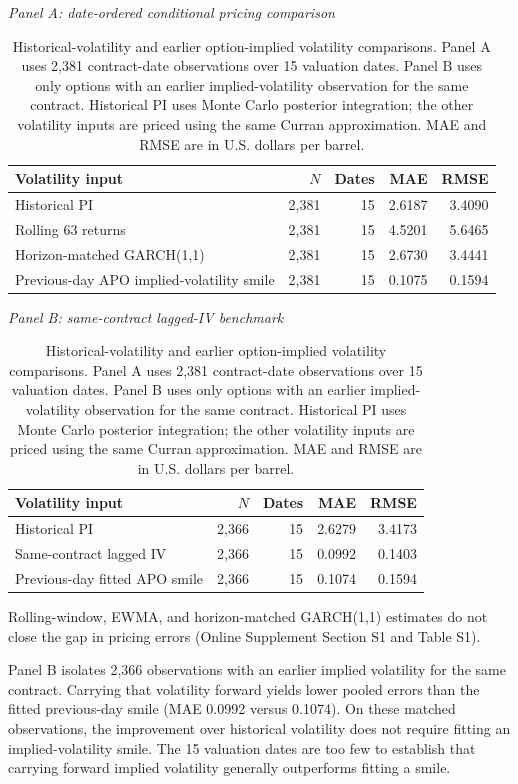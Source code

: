\begin{table}[t]
\centering
\caption{Historical-volatility and earlier option-implied volatility comparisons. Panel A uses 2,381 contract-date observations over 15 valuation dates. Panel B uses only options with an earlier implied-volatility observation for the same contract. Historical PI uses Monte Carlo posterior integration; the other volatility inputs are priced using the same Curran approximation. MAE and RMSE are in U.S. dollars per barrel.}\label{tab:short_forward}

\textit{Panel A: date-ordered conditional pricing comparison}\\[2pt]
\begin{tabular}{lrrrr}
\toprule
Volatility input & $N$ & Dates & MAE & RMSE\\
\midrule
Historical PI & 2,381 & 15 & 2.6187 & 3.4090\\
Rolling 63 returns & 2,381 & 15 & 4.5201 & 5.6465\\
Horizon-matched GARCH(1,1) & 2,381 & 15 & 2.6730 & 3.4441\\
Previous-day APO implied-volatility smile & 2,381 & 15 & 0.1075 & 0.1594\\
\bottomrule
\end{tabular}

\vspace{5pt}
\textit{Panel B: same-contract lagged-IV benchmark}\\[2pt]
\begin{tabular}{lrrrr}
\toprule
Volatility input & $N$ & Dates & MAE & RMSE\\
\midrule
Historical PI & 2,366 & 15 & 2.6279 & 3.4173\\
Same-contract lagged IV & 2,366 & 15 & 0.0992 & 0.1403\\
Previous-day fitted APO smile & 2,366 & 15 & 0.1074 & 0.1594\\
\bottomrule
\end{tabular}
\end{table}

Rolling-window, EWMA, and horizon-matched GARCH(1,1) estimates do not close the gap in pricing errors (Online Supplement Section S1 and Table S1).

Panel B isolates 2,366 observations with an earlier implied volatility for the same contract. Carrying that volatility forward yields lower pooled errors than the fitted previous-day smile (MAE 0.0992 versus 0.1074). On these matched observations, the improvement over historical
volatility does not require fitting an implied-volatility smile.
The 15 valuation dates are too few to establish that
carrying forward implied volatility generally outperforms
fitting a smile.

